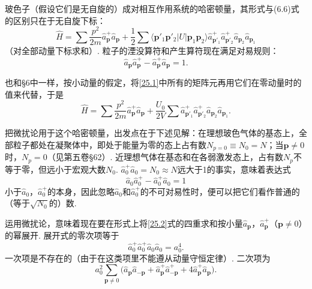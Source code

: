 玻色子（假设它们是无自旋的）成对相互作用系统的哈密顿量，其形式与(6.6)式的区别只在于无自旋下标：
\begin{equation}
\hat{H}=\sum\frac{p^{2}}{2m}\hat{a}^{+}_{\bm{p}}\hat{a}_{\bm{p}}
+\frac{1}{2}\sum\langle\bm{p}'_{1}\bm{p}'_{2}\vert U\vert\bm{p}_{1}\bm{p}_{2}\rangle
\hat{a}^{+}_{\bm{p}'_{1}}\hat{a}^{+}_{\bm{p}'_{2}}\hat{a}_{\bm{p}_{2}}\hat{a}_{\bm{p}_{1}}
\label{25.1}
\end{equation}
（对全部动量下标求和）. 粒子的湮没算符和产生算符现在满足对易规则：
\begin{equation*}
\hat{a}_{\bm{p}}\hat{a}^{+}_{\bm{p}}-\hat{a}^{+}_{\bm{p}}\hat{a}_{\bm{p}}=1.
\end{equation*}

也和§6中一样，按小动量的假定，将\eqref{25.1}中所有的矩阵元再用它们在零动量时的值来代替，于是
\begin{equation}
\hat{H}=\sum\frac{p^{2}}{2m}\hat{a}^{+}_{\bm{p}}\hat{a}_{\bm{p}}
+\frac{U_{0}}{2V}\sum\hat{a}^{+}_{\bm{p}'_{1}}\hat{a}^{+}_{\bm{p}'_{2}}\hat{a}_{\bm{p}_{2}}\hat{a}_{\bm{p}_{1}}.
\label{25.2}
\end{equation}

把微扰论用于这个哈密顿量，出发点在于下述见解：在理想玻色气体的基态上，全部粒子都处在凝聚体中，即处于能量为零的态上占有数$N_{p=0}\equiv N_{0}=N$；当$\bm{p}\neq 0$时，$N_{p}=0$（见第五卷§62）. 近理想气体在基态和在各弱激发态上，占有数$N_{p}$不等于零，但远小于宏观大数$N_{0}$. $\hat{a}^{+}_{0}\hat{a}_{0}=N_{0}\approx N$远大于1的事实，意味着表达式
\begin{equation*}
\hat{a}_{0}\hat{a}^{+}_{0}-\hat{a}^{+}_{0}\hat{a}_{0}=1
\end{equation*}
小于$\hat{a}_{0}$，$\hat{a}^{+}_{0}$的本身，因此忽略$\hat{a}_{0}$和$\hat{a}^{+}_{0}$的不可对易性时，便可以把它们看作普通的（等于$\sqrt{N_{0}}$的）数.

运用微扰论，意味着现在要在形式上将\eqref{25.2}式的四重求和按小量$\hat{a}_{\bm{p}}$，$\hat{a}^{+}_{\bm{p}}$（$\bm{p}\neq 0$）的幂展开. 展开式的零次项等于
\begin{equation}
\hat{a}^{+}_{0}\hat{a}^{+}_{0}\hat{a}_{0}\hat{a}_{0}=a_{0}^{4}.
\label{25.3}
\end{equation}
一次项是不存在的（由于在这类项里不能遵从动量守恒定律）. 二次项为
\begin{equation}
a_{0}^{2}\sum_{\bm{p}\neq 0}\bigl(\hat{a}_{\bm{p}}\hat{a}_{-\bm{p}}
+\hat{a}^{+}_{\bm{p}}\hat{a}^{+}_{-\bm{p}}+4\hat{a}^{+}_{\bm{p}}\hat{a}_{\bm{p}}\bigr).
\label{25.4}
\end{equation}

